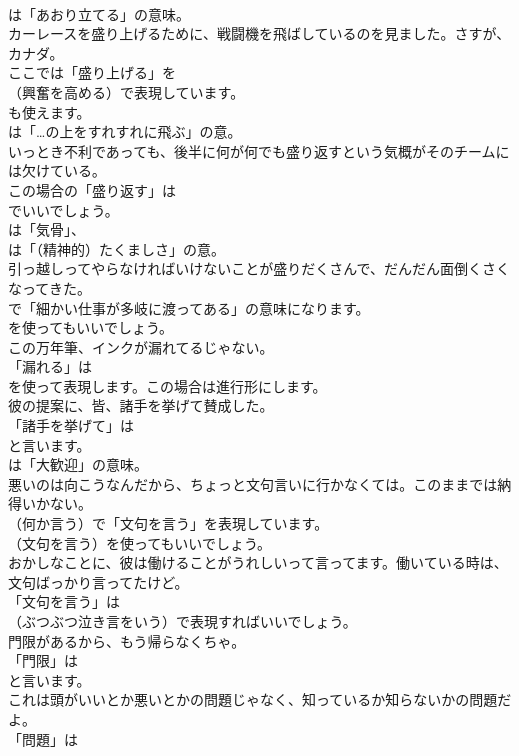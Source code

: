 \documentclass[8pt]{extreport}
\begin{document}
\begin{CJK}{UTF8}{min}
\\	は「あおり立てる」の意味。	
\\	カーレースを盛り上げるために、戦闘機を飛ばしているのを見ました。さすが、カナダ。 
\\	ここでは「盛り上げる」を 
\\	（興奮を高める）で表現しています。
\\	も使えます。
\\	は「…の上をすれすれに飛ぶ」の意。	
\\	いっとき不利であっても、後半に何が何でも盛り返すという気概がそのチームには欠けている｡ 
\\	この場合の「盛り返す」は 
\\	でいいでしょう。
\\	は「気骨」、
\\	は「（精神的）たくましさ」の意。	
\\	引っ越しってやらなければいけないことが盛りだくさんで、だんだん面倒くさくなってきた。 
\\	で「細かい仕事が多岐に渡ってある」の意味になります。
\\	を使ってもいいでしょう。	
\\	この万年筆、インクが漏れてるじゃない。 
\\	「漏れる」は
\\	を使って表現します。この場合は進行形にします。	
\\	彼の提案に、皆、諸手を挙げて賛成した。 
\\	「諸手を挙げて」は
\\	と言います。
\\	は「大歓迎」の意味。	
\\	悪いのは向こうなんだから、ちょっと文句言いに行かなくては。このままでは納得いかない。 
\\	（何か言う）で「文句を言う」を表現しています。
\\	（文句を言う）を使ってもいいでしょう。	
\\	おかしなことに、彼は働けることがうれしいって言ってます。働いている時は、文句ばっかり言ってたけど。 
\\	「文句を言う」は 
\\	（ぶつぶつ泣き言をいう）で表現すればいいでしょう。	
\\	門限があるから、もう帰らなくちゃ。 
\\	「門限」は
\\	と言います。	
\\	これは頭がいいとか悪いとかの問題じゃなく、知っているか知らないかの問題だよ。 
\\	「問題」は 

\end{CJK}
\end{document}
